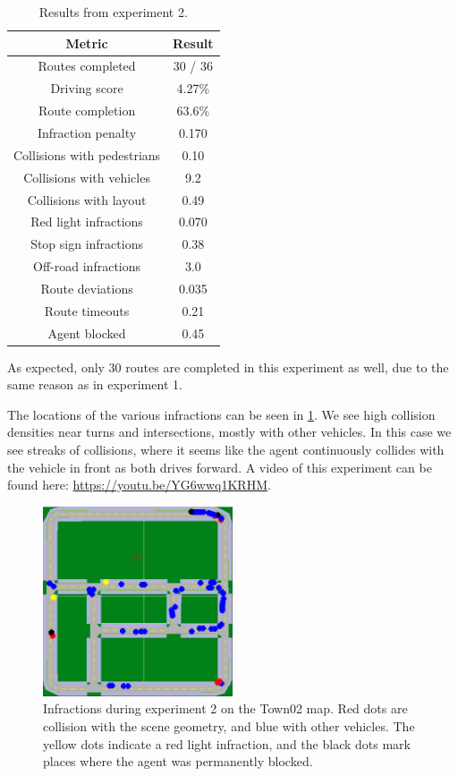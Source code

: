\begin{table}[]
    \centering
    \begin{tabular}{|c|c|}
        \hline
        \textbf{Metric} & \textbf{Result} \\ \hline
        Routes completed & 30 / 36 \\ \hline
        Driving score & 4.27\% \\ \hline
        Route completion & 63.6\% \\ \hline
        Infraction penalty & 0.170 \\ \hline
        Collisions with pedestrians & 0.10 \\ \hline
        Collisions with vehicles & 9.2 \\ \hline
        Collisions with layout & 0.49 \\ \hline
        Red light infractions & 0.070 \\ \hline
        Stop sign infractions & 0.38 \\ \hline
        Off-road infractions & 3.0 \\ \hline
        Route deviations & 0.035 \\ \hline
        Route timeouts & 0.21 \\ \hline
        Agent blocked & 0.45 \\ \hline
    \end{tabular}
    \caption{Results from experiment 2.}
    \label{tab:exp2:results}
\end{table}

As expected, only 30 routes are completed in this experiment as well, due to the same reason as in experiment 1.

The locations of the various infractions can be seen in \cref{fig:exp2:town02}.
We see high collision densities near turns and intersections,
mostly with other vehicles.
In this case we see streaks of collisions,
where it seems like the agent continuously collides
with the vehicle in front as both drives forward. 
A video of this experiment can be found here: \url{https://youtu.be/YG6wwq1KRHM}.

\begin{figure}
    \centering
    \includegraphics[width=0.5\textwidth]{figures/results/exp2-town02.png}
    \caption{Infractions during experiment 2 on the Town02 map.
    Red dots are collision with the scene geometry,
    and blue with other vehicles.
    The yellow dots indicate a red light infraction,
    and the black dots mark places where the agent was permanently blocked.}
    \label{fig:exp2:town02}
\end{figure}


